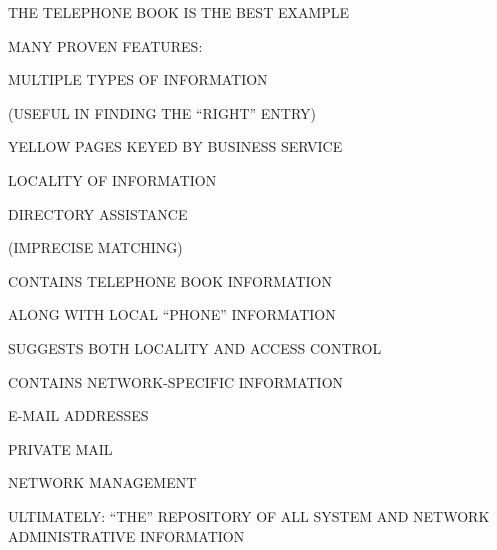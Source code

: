 \begin{bwslide}

\begin{nrtc}
\item	THE TELEPHONE BOOK IS THE BEST EXAMPLE

\item	MANY PROVEN FEATURES:
    \begin{nrtc}
    \item	MULTIPLE TYPES OF INFORMATION 
	\begin{nrtc}
	\item	(USEFUL IN FINDING THE ``RIGHT'' ENTRY)
	\end{nrtc}

    \item	YELLOW PAGES KEYED BY BUSINESS SERVICE

    \item	LOCALITY OF INFORMATION

    \item	DIRECTORY ASSISTANCE
	\begin{nrtc}
	\item	(IMPRECISE MATCHING)
	\end{nrtc}
    \end{nrtc}
\end{nrtc}
\end{bwslide}


\begin{bwslide}

\begin{nrtc}
\item	CONTAINS TELEPHONE BOOK INFORMATION
    \begin{nrtc}
    \item	ALONG WITH LOCAL ``PHONE'' INFORMATION

    \item	SUGGESTS BOTH LOCALITY AND ACCESS CONTROL
    \end{nrtc}

\item	CONTAINS NETWORK-SPECIFIC INFORMATION
    \begin{nrtc}
    \item	E-MAIL ADDRESSES

    \item	PRIVATE MAIL

    \item	NETWORK MANAGEMENT
    \end{nrtc}

\item	ULTIMATELY: ``THE'' REPOSITORY OF ALL SYSTEM AND
	NETWORK ADMINISTRATIVE INFORMATION
\end{nrtc}
\end{bwslide}



